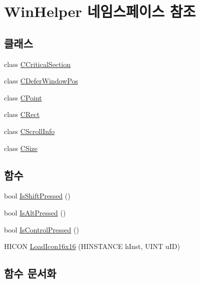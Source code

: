\hypertarget{namespace_win_helper}{}\section{Win\+Helper 네임스페이스 참조}
\label{namespace_win_helper}
\subsection*{클래스}
\begin{DoxyCompactItemize}
\item 
class \mbox{\hyperlink{class_win_helper_1_1_c_critical_section}{C\+Critical\+Section}}
\item 
class \mbox{\hyperlink{class_win_helper_1_1_c_defer_window_pos}{C\+Defer\+Window\+Pos}}
\item 
class \mbox{\hyperlink{class_win_helper_1_1_c_point}{C\+Point}}
\item 
class \mbox{\hyperlink{class_win_helper_1_1_c_rect}{C\+Rect}}
\item 
class \mbox{\hyperlink{class_win_helper_1_1_c_scroll_info}{C\+Scroll\+Info}}
\item 
class \mbox{\hyperlink{class_win_helper_1_1_c_size}{C\+Size}}
\end{DoxyCompactItemize}
\subsection*{함수}
\begin{DoxyCompactItemize}
\item 
bool \mbox{\hyperlink{namespace_win_helper_aacb2f91c6ca28b7a5b4b87e52cc2ab9f}{Is\+Shift\+Pressed}} ()
\item 
bool \mbox{\hyperlink{namespace_win_helper_a7eb0bf2b37a02c9fd467b7258a856148}{Is\+Alt\+Pressed}} ()
\item 
bool \mbox{\hyperlink{namespace_win_helper_a0bf0eb5c03232357051e8b4c552a5792}{Is\+Control\+Pressed}} ()
\item 
H\+I\+C\+ON \mbox{\hyperlink{namespace_win_helper_a2ce42916bda6434a5432df1ea8071183}{Load\+Icon16x16}} (H\+I\+N\+S\+T\+A\+N\+CE h\+Inst, U\+I\+NT u\+ID)
\end{DoxyCompactItemize}


\subsection{함수 문서화}
\mbox{\label{namespace_win_helper_a7eb0bf2b37a02c9fd467b7258a856148}} 
